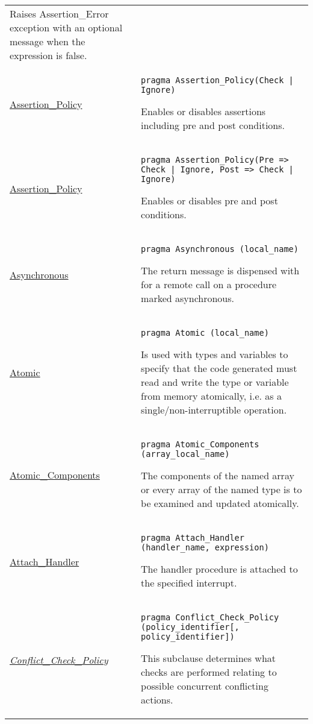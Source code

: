 \documentclass[english]{article}
\begin{document}
\begin{scriptsize}
\begin{multicols*}{3}
\begin{tabular}{@{}p{2cm}p{6.5cm}}
   Raises Assertion\_Error exception with an optional message when the expression is false.\\

   \href{http://www.ada-auth.org/standards/22rm/html/RM-11-4-2.html}{Assertion\_Policy} & \texttt{pragma Assertion\_Policy(Check | Ignore)}

   Enables or disables assertions including pre and post conditions.\\

   \href{http://www.ada-auth.org/standards/22rm/html/RM-11-4-2.html}{Assertion\_Policy} & \texttt{pragma Assertion\_Policy(Pre => Check | Ignore, Post => Check | Ignore)}

   Enables or disables pre and post conditions.\\

   \href{http://www.ada-auth.org/standards/22rm/html/RM-J-15-13.html}{Asynchronous} & \texttt{pragma Asynchronous (local\_name)}

   The return message is dispensed with for a remote call on a procedure marked asynchronous.\\

   \href{http://www.ada-auth.org/standards/22rm/html/RM-J-15-8.html}{Atomic} & \texttt{pragma Atomic (local\_name)}

   Is used with types and variables to specify that the code generated must read and write the type or variable from memory atomically, i.e. as a single/non-interruptible operation.\\

   \href{http://www.ada-auth.org/standards/22rm/html/RM-J-15-8.html}{Atomic\_Components} & \texttt{pragma Atomic\_Components (array\_local\_name)}

   The components of the named array or every array of the named type is to be examined and updated atomically.\\

   \href{http://www.ada-auth.org/standards/22rm/html/RM-J-15-7.html}{Attach\_Handler} & \texttt{pragma Attach\_Handler (handler\_name, expression)}

   The handler procedure is attached to the specified interrupt.\\

   \href{http://www.ada-auth.org/standards/22rm/html/RM-9-10-1.html}{\textit{Conflict\_Check\_Policy}} & \texttt{pragma Conflict\_Check\_Policy (policy\_identifier[, policy\_identifier])}

   This subclause determines what checks are performed relating to possible concurrent conflicting actions.\\


\end{tabular}
\end{multicols*}
\end{scriptsize}
\end{document}
